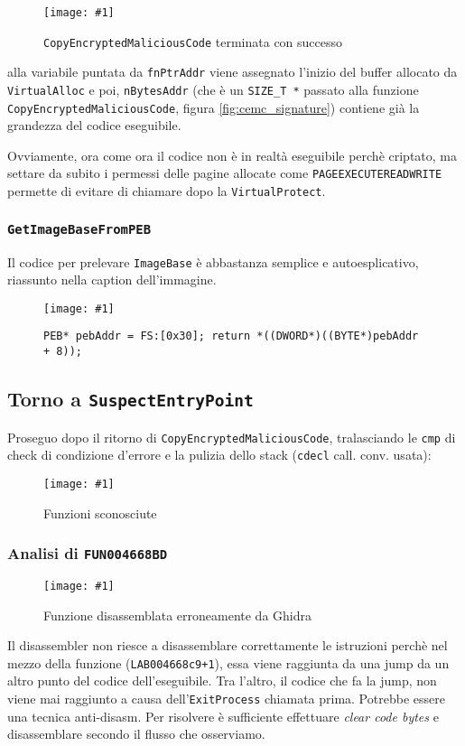 \documentclass[
    a4paper, %
    11pt %
]{article}
\newcommand{\pic}[4]{\begin{figure}[H]
            \centering
            \texttt{[image: \#1]}
            \caption{#2}
            \label{fig:#1}
            \end{figure}}
\begin{document}
            \pic{cemc_success}{\texttt{CopyEncryptedMaliciousCode} terminata con successo}{18cm}{9cm}

            alla variabile puntata da \texttt{fnPtrAddr} viene assegnato l'inizio del buffer allocato da 
            \texttt{VirtualAlloc} e poi, \texttt{nBytesAddr} (che è un \texttt{SIZE\_T *} passato alla funzione \texttt{CopyEncryptedMaliciousCode}, figura \ref{fig:cemc_signature}) contiene già la grandezza del codice eseguibile.

            Ovviamente, ora come ora il codice non è in realtà eseguibile perchè criptato, ma settare da subito
            i permessi delle pagine allocate come \texttt{PAGE\textunderscore EXECUTE\textunderscore READWRITE} permette di evitare di chiamare
            dopo la \texttt{VirtualProtect}.

            \subsubsection{\texttt{Get\textunderscore ImageBase\textunderscore FromPEB}}
            Il codice per prelevare \texttt{ImageBase} è abbastanza semplice e autoesplicativo, riassunto nella caption
            dell'immagine.
            \pic{getimagebase}{\texttt{PEB* pebAddr = FS:[0x30]; return *((DWORD*)((BYTE*)pebAddr + 8));}}{18cm}{9cm}

            \subsection{Torno a \texttt{SuspectEntryPoint}}

            Proseguo dopo il ritorno di \texttt{CopyEncryptedMaliciousCode}, tralasciando le \texttt{cmp} di check
            di condizione d'errore e la pulizia dello stack (\texttt{\textunderscore\textunderscore cdecl} 
            call. conv. usata):

            \pic{see_nextunkfn}{Funzioni sconosciute}{13cm}{3cm}

            \subsubsection{Analisi di \texttt{FUN\textunderscore 004668BD}}

            \pic{see_unkfn0_wrong}{Funzione disassemblata erroneamente da Ghidra}{11cm}{14cm}

            Il disassembler non riesce a disassemblare correttamente le istruzioni perchè nel mezzo della 
            funzione (\texttt{LAB\textunderscore 004668c9+1}), essa viene raggiunta da una jump da un altro punto del codice dell'eseguibile. Tra l'altro,
            il codice che fa la jump, non viene mai raggiunto a causa dell'\texttt{ExitProcess} chiamata prima.
            Potrebbe essere una tecnica anti-disasm. Per risolvere è sufficiente effettuare \textit{clear code bytes} e 
            disassemblare secondo il flusso che osserviamo.
\end{document}
